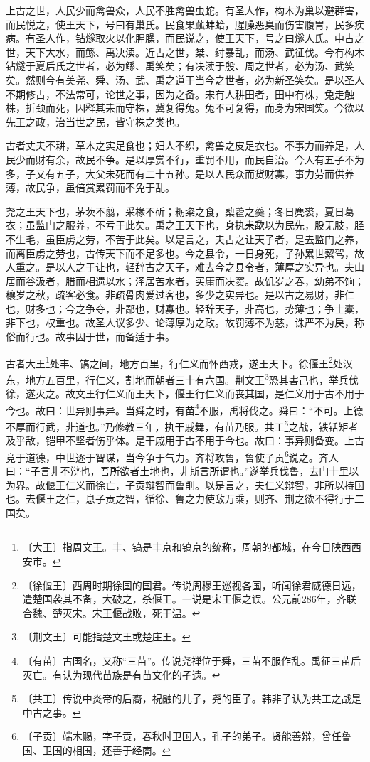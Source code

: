 \documentclass[12pt,UTF-8,openany]{ctexbook}
\begin{document}
\begin{normalsize}
    
    上古之世，人民少而禽兽众，人民不胜禽兽虫蛇。有圣人作，构木为巢以避群害，而民悦之，使王天下，号曰有巢氏。民食果蓏蚌蛤，腥臊恶臭而伤害腹胃，民多疾病。有圣人作，钻燧取火以化腥臊，而民说之，使王天下，号之曰燧人氏。中古之世，天下大水，而鲧、禹决渎。近古之世，桀、纣暴乱，而汤、武征伐。今有构木钻燧于夏后氏之世者，必为鲧、禹笑矣；有决渎于殷、周之世者，必为汤、武笑矣。然则今有美尧、舜、汤、武、禹之道于当今之世者，必为新圣笑矣。是以圣人不期修古，不法常可，论世之事，因为之备。宋有人耕田者，田中有株，兔走触株，折颈而死，因释其耒而守株，冀复得兔。兔不可复得，而身为宋国笑。今欲以先王之政，治当世之民，皆守株之类也。
     
    古者丈夫不耕，草木之实足食也；妇人不织，禽兽之皮足衣也。不事力而养足，人民少而财有余，故民不争。是以厚赏不行，重罚不用，而民自治。今人有五子不为多，子又有五子，大父未死而有二十五孙。是以人民众而货财寡，事力劳而供养薄，故民争，虽倍赏累罚而不免于乱。
     
    尧之王天下也，茅茨不翦，采椽不斫；粝粢之食，䔧藿之羹；冬日麂裘，夏日葛衣；虽监门之服养，不亏于此矣。禹之王天下也，身执耒歃以为民先，股无肢，胫不生毛，虽臣虏之劳，不苦于此矣。以是言之，夫古之让天子者，是去监门之养，而离臣虏之劳也，古传天下而不足多也。今之县令，一日身死，子孙累世絜驾，故人重之。是以人之于让也，轻辞古之天子，难去今之县令者，薄厚之实异也。夫山居而谷汲者，腊而相遗以水；泽居苦水者，买庸而决窦。故饥岁之春，幼弟不饷；穰岁之秋，疏客必食。非疏骨肉爱过客也，多少之实异也。是以古之易财，非仁也，财多也；今之争夺，非鄙也，财寡也。轻辞天子，非高也，势薄也；争士橐，非下也，权重也。故圣人议多少、论薄厚为之政。故罚薄不为慈，诛严不为戾，称俗而行也。故事因于世，而备适于事。
     
    古者大王\footnote{〔大王〕指周文王。丰、镐是丰京和镐京的统称，周朝的都城，在今日陕西西安市。}处丰、镐之间，地方百里，行仁义而怀西戎，遂王天下。徐偃王\footnote{〔徐偃王〕西周时期徐国的国君。传说周穆王巡视各国，听闻徐君威德日远，遣楚国袭其不备，大破之，杀偃王。一说是宋王偃之误。公元前286年，齐联合魏、楚灭宋。宋王偃战败，死于温。}处汉东，地方五百里，行仁义，割地而朝者三十有六国。荆文王\footnote{〔荆文王〕可能指楚文王或楚庄王。}恐其害己也，举兵伐徐，遂灭之。故文王行仁义而王天下，偃王行仁义而丧其国，是仁义用于古不用于今也。故曰：世异则事异。当舜之时，有苗\footnote{〔有苗〕古国名，又称“三苗”。传说尧禅位于舜，三苗不服作乱。禹征三苗后灭亡。有认为现代苗族是有苗文化的孑遗。}不服，禹将伐之。舜曰：“不可。上德不厚而行武，非道也。”乃修教三年，执干戚舞，有苗乃服。共工\footnote{〔共工〕传说中炎帝的后裔，祝融的儿子，尧的臣子。韩非子认为共工之战是中古之事。}之战，铁铦矩者及乎敌，铠甲不坚者伤乎体。是干戚用于古不用于今也。故曰：事异则备变。上古竞于道德，中世逐于智谋，当今争于气力。齐将攻鲁，鲁使子贡\footnote{〔子贡〕端木赐，字子贡，春秋时卫国人，孔子的弟子。贤能善辩，曾任鲁国、卫国的相国，还善于经商。}说之。齐人曰：“子言非不辩也，吾所欲者土地也，非斯言所谓也。”遂举兵伐鲁，去门十里以为界。故偃王仁义而徐亡，子贡辩智而鲁削。以是言之，夫仁义辩智，非所以持国也。去偃王之仁，息子贡之智，循徐、鲁之力使敌万乘，则齐、荆之欲不得行于二国矣。
    

\end{normalsize}
\end{document}
